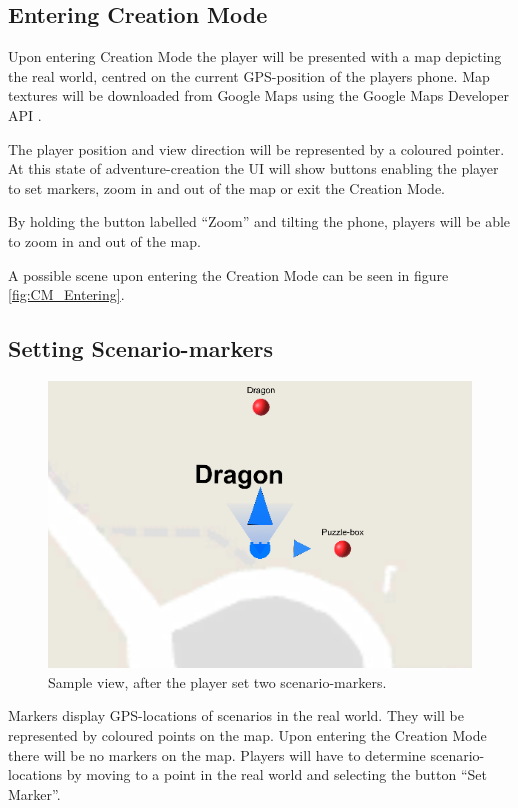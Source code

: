 \documentclass{sigchi-ext}
\begin{document}
\subsection{Entering Creation Mode}

Upon entering Creation Mode the player will be presented with a map depicting the real world, centred on the current GPS-position of the players phone. Map textures will be downloaded from Google Maps \cite{googlemaps} using the Google Maps Developer API \cite{googlemapsAPI}.

The player position and view direction will be represented by a coloured pointer. At this state of adventure-creation the UI will show buttons enabling the player to set markers, zoom in and out of the map or exit the Creation Mode.

By holding the button labelled ``Zoom'' and tilting the phone, players will be able to zoom in and out of the map.

A possible scene upon entering the Creation Mode can be seen in figure \ref{fig:CM_Entering}.
 

\subsection{Setting Scenario-markers}

\begin{figure}
	\includegraphics[width=1\columnwidth]{figures/CM_Markers}
	\caption{Sample view, after the player set two scenario-markers.}\label{fig:CM_Markers}
\end{figure}

Markers display GPS-locations of scenarios in the real world. They will be represented by coloured points on the map. Upon entering the Creation Mode there will be no markers on the map. Players will have to determine scenario-locations by moving to a point in the real world and selecting the button ``Set Marker''.
\end{document}
